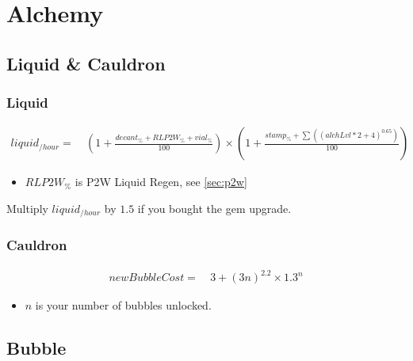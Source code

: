 \chapter{Alchemy}
    \section{Liquid \& Cauldron}
        \subsection{Liquid}
            \begin{align*}
                liquid_{/hour} = &\ 
                    \left( 1 + \frac{ decant_\% + RLP2W_\% + vial_\% }{100} \right)
                    \times 
                    \left( 1+ \frac{ stamp_\% + \sum \left( (alchLvl * 2 + 4 )^{0.65} \right) }{100} \right)
            \end{align*}
            \begin{itemize}
                \item $RLP2W_\%$ is P2W Liquid Regen, see \ref{sec:p2w}
            \end{itemize}
            Multiply $liquid_{/hour}$ by $1.5$ if you bought the gem upgrade.
        

        \subsection{Cauldron}
            \begin{align*}
                newBubbleCost = &\ 3 + (3n)^{2.2} \times 1.3^n
            \end{align*}
            \begin{itemize}
                \item $n$ is your number of bubbles unlocked.
            \end{itemize}

    \newpage
    \section{Bubble}

